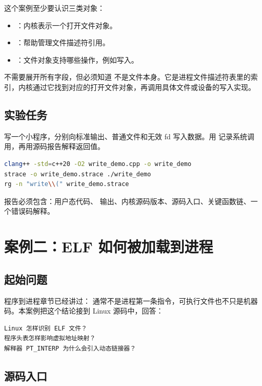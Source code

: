 这个案例至少要认识三类对象：

\begin{itemize}
  \item {}：内核表示一个打开文件对象。
  \item {}：帮助管理文件描述符引用。
  \item {}：文件对象支持哪些操作，例如写入。
\end{itemize}

不需要展开所有字段，但必须知道  不是文件本身。它是进程文件描述符表里的索引，内核通过它找到对应的打开文件对象，再调用具体文件或设备的写入实现。

\subsection{实验任务}

\begin{labbox}
写一个小程序，分别向标准输出、普通文件和无效 fd 写入数据。用  记录系统调用，再用源码报告解释返回值。

\begin{lstlisting}[language=bash]
clang++ -std=c++20 -O2 write_demo.cpp -o write_demo
strace -o write_demo.strace ./write_demo
rg -n "write\\(" write_demo.strace
\end{lstlisting}

报告必须包含：用户态代码、 输出、内核源码版本、源码入口、关键函数链、一个错误码解释。
\end{labbox}

\section{案例二：ELF 如何被加载到进程}

\subsection{起始问题}

程序到进程章节已经讲过： 通常不是进程第一条指令，可执行文件也不只是机器码。本案例把这个结论接到 Linux 源码中，回答：

\begin{lstlisting}
Linux 怎样识别 ELF 文件？
程序头表怎样影响虚拟地址映射？
解释器 PT_INTERP 为什么会引入动态链接器？
\end{lstlisting}

\subsection{源码入口}

